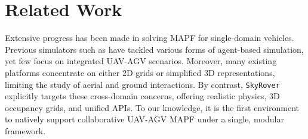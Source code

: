 \section{Related Work}
Extensive progress has been made in solving MAPF for single-domain vehicles\cite{ma2022graph,salzman2020research,surynek2022problem}. 
Previous simulators such as \cite{mavswarm2022,nguyen2019generalized,okumura2021iterative,skrynnik2024pogema,WangICAPS24mapf3d} have tackled various forms of agent-based simulation, yet few focus on integrated UAV-AGV scenarios. 
Moreover, many existing platforms concentrate on either 2D grids or simplified 3D representations, limiting the study of aerial and ground interactions. 
By contrast, \texttt{SkyRover} explicitly targets these cross-domain concerns, offering realistic physics, 3D occupancy grids, and unified APIs. 
To our knowledge, it is the first environment to natively support collaborative UAV-AGV MAPF under a single, modular framework.
